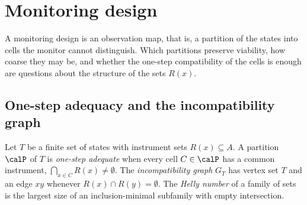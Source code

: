 \section{Monitoring design}\label{sec:monitor}

A monitoring design is an observation map, that is, a partition of the states into cells the monitor cannot distinguish. Which partitions preserve viability, how coarse they may be, and whether the one-step compatibility of the cells is enough are questions about the structure of the sets $R(x)$.

\subsection{One-step adequacy and the incompatibility graph}

\begin{definition}\label{def:adequacy}
Let $T$ be a finite set of states with instrument sets $R(x)\subseteq A$. A partition $\calP$ of $T$ is \emph{one-step adequate} when every cell $C\in\calP$ has a common instrument, $\bigcap_{x\in C}R(x)\neq\emptyset$. The \emph{incompatibility graph} $G_T$ has vertex set $T$ and an edge $xy$ whenever $R(x)\cap R(y)=\emptyset$. The \emph{Helly number} of a family of sets is the largest size of an inclusion-minimal subfamily with empty intersection.
\end{definition}

